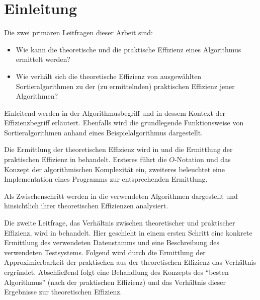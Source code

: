 \chapter*{Einleitung}


Die zwei primären Leitfragen dieser Arbeit sind:

\begin{itemize}
    \item Wie kann die theoretische und die praktische Effizienz eines Algorithmus ermittelt werden?
    \item Wie verhält sich die theoretische Effizienz von ausgewählten Sortieralgorithmen zu der (zu ermittelnden) praktischen Effizienz jener Algorithmen?
\end{itemize}

Einleitend werden in  der Algorithmusbegriff und in dessem Kontext der Effizienzbegriff erläutert. Ebenfalls wird die grundlegende Funktionsweise von Sortieralgorithmen anhand eines Beispielalgorithmus dargestellt.

Die Ermittlung der theoretischen Effizienz wird in  und die Ermittlung der praktischen Effizienz in  behandelt. Ersteres führt die $O$-Notation und das Konzept der algorithmischen Komplexität ein, zweiteres beleuchtet eine Implementation eines Programms zur entsprechenden Ermittlung.

Als Zwischenschritt werden in  die verwendeten Algorithmen dargestellt und hinsichtlich ihrer theoretischen Effizienzen analysiert.

Die zweite Leitfrage, das Verhältnis zwischen theoretischer und praktischer Effizienz, wird in  behandelt. Hier geschieht in einem ersten Schritt eine konkrete Ermittlung des verwendeten Datenstamms und eine Beschreibung des verwendeten Testsystems. Folgend wird durch die Ermittlung der Approximierbarkeit der praktischen aus der theoretischen Effizienz das Verhältnis ergründet. Abschließend folgt eine Behandlung des Konzepts des \enquote{besten Algorithmus} (nach der praktischen Effizienz) und das Verhältnis dieser Ergebnisse zur theoretischen Effizienz.

